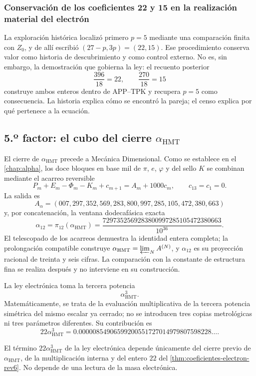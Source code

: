 \subsubsection{Conservación de los coeficientes 22 y 15 en la realización material del electrón}

La exploración histórica localizó primero \(p=5\) mediante una comparación
finita con \(Z_0\), y de allí escribió
\((27-p,3p)=(22,15)\). Ese procedimiento conserva valor como historia de
descubrimiento y como control externo. No es, sin embargo, la demostración
que gobierna la ley: el recuento posterior
\[
 \frac{396}{18}=22,
 \qquad
 \frac{270}{18}=15
\]
construye ambos enteros dentro de APP--TPK y recupera \(p=5\) como
consecuencia. La historia explica cómo se encontró la pareja; el censo
explica por qué pertenece a la ecuación.

\subsection{5.º factor: el cubo del cierre \(\alpha_{\mathrm{HMT}}\)}

El cierre de \(\alpha_{\mathrm{HMT}}\) precede a Mecánica Dimensional.
Como se establece en el \cref{chap:alpha}, los doce bloques en base mil
de \(\pi\), \(e\), \(\varphi\) y del sello \(K\) se combinan mediante el
acarreo reversible
\[
 P_m+E_m-\Phi_m-K_m+c_{m+1}
 =A_m+1000c_m,
 \qquad c_{13}=c_1=0.
\]
La salida es
\[
 A_\alpha=
 (007,297,352,569,283,800,997,285,105,472,380,663)
\]
y, por concatenación, la ventana dodecafásica exacta
\[
 \alpha_{12}=\pi_{12}(\alpha_{\mathrm{HMT}})
 =
 \frac{
 7297352569283800997285105472380663
 }{10^{36}}.
\]
El telescopado de los acarreos demuestra la identidad entera completa; la
prolongación compatible construye
\(\alpha_{\mathrm{HMT}}=\varprojlim_N A^{(N)}\), y \(\alpha_{12}\) es su
proyección racional de treinta y seis cifras. La
comparación con la constante de estructura fina se realiza después y no
interviene en su construcción.

La ley electrónica toma la tercera potencia
\[
 \alpha_{\mathrm{HMT}}^3.
\]
Matemáticamente, se trata de la evaluación multiplicativa de la tercera
potencia simétrica del mismo escalar ya cerrado; no se introducen tres
copias metrológicas ni tres parámetros diferentes. Su contribución es
\[
 22\alpha_{\mathrm{HMT}}^3
 =
 0.00000854906599200551727014979807598228\ldots.
\]

\begin{proposition}
\label{prop:alpha-cubica-electron-rev6}
El término \(22\alpha_{\mathrm{HMT}}^3\) de la ley electrónica depende
únicamente del cierre previo de \(\alpha_{\mathrm{HMT}}\), de la
multiplicación interna y del entero \(22\) del
\cref{thm:coeficientes-electron-rev6}. No depende de una lectura de la
masa electrónica.
\end{proposition}

